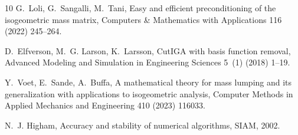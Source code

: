 \documentclass{article}
\numberwithin{equation}{section}
\theoremstyle{definition}
\begin{document}
\begin{thebibliography}{10}
G.~Loli, G.~Sangalli, M.~Tani, Easy and efficient preconditioning of the isogeometric mass matrix, Computers \& Mathematics with Applications 116 (2022) 245--264.

D.~Elfverson, M.~G. Larson, K.~Larsson, {CutIGA} with basis function removal, Advanced Modeling and Simulation in Engineering Sciences 5~(1) (2018) 1--19.

Y.~Voet, E.~Sande, A.~Buffa, A mathematical theory for mass lumping and its generalization with applications to isogeometric analysis, Computer Methods in Applied Mechanics and Engineering 410 (2023) 116033.

N.~J. Higham, Accuracy and stability of numerical algorithms, SIAM, 2002.

\end{thebibliography}
\end{document}
